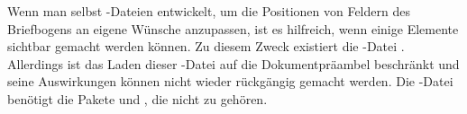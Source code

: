 \begin{Declaration}
\end{Declaration}
%
Wenn man selbst -Dateien entwickelt, %
\iffalse beispielsweise \fi %
um die Positionen von %
\iffalse verschiedenen \fi %
Feldern des Briefbogens an eigene Wünsche %
\iffalse oder Notwendigkeiten \fi %
anzupassen, ist es hilfreich, wenn %
\iffalse zumindest \fi %
einige Elemente %
\iffalse direkt \fi %
sichtbar gemacht werden können. Zu diesem Zweck existiert die -Datei
%
\iffalse , die wie jede \File{lco}-Datei geladen werden
kann\fi %
. Allerdings ist das Laden dieser %
\iffalse \emph{Letter Class Option} \else {}-Datei
\fi%
auf die Dokumentpräambel beschränkt und seine Auswirkungen können nicht wieder
rückgängig gemacht werden. Die -Datei %
\iffalse bedient sich der \else benötigt die \fi %
Pakete %
 und
, die nicht zu \KOMAScript{} gehören.

